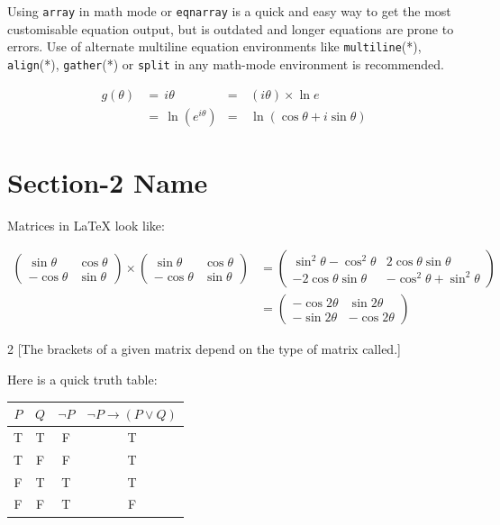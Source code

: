 
Using \verb+array+ in math mode or \verb+eqnarray+ is a quick and easy way to get the most customisable equation output, but is outdated and longer equations are prone to errors. Use of alternate multiline equation environments like \verb+multiline+(*), \verb+align+(*), \verb+gather+(*) or \verb+split+ in any math-mode environment is recommended.

\begin{align}\label{eq3}
g(\theta) &= \, i\theta &=& \, (i\theta) \times \ln e \nonumber \\
&= \, \ln(e^{i\theta}) &=& \, \ln(\cos\theta + i\sin\theta)
\end{align}


\section{Section-2 Name}

Matrices in {\LaTeX} look like:

\begin{align*}
\begin{pmatrix}
\sin\theta & \cos\theta\\
-\cos\theta & \sin\theta
\end{pmatrix}
\times
\begin{pmatrix}
\sin\theta & \cos\theta\\
-\cos\theta & \sin\theta
\end{pmatrix} &=
\begin{pmatrix}
\sin^2\theta - \cos^2\theta & 2\cos\theta\sin\theta\\
-2\cos\theta\sin\theta & -\cos^2\theta + \sin^2\theta
\end{pmatrix} \\
&=
\begin{pmatrix}
-\cos2\theta & \sin2\theta\\
-\sin2\theta & -\cos2\theta
\end{pmatrix}
\end{align*}
\begin{multicols}{2}
[The brackets of a given matrix depend on the type of matrix called.]
\begin{flushright}
    Here is a quick truth table:
\end{flushright}
\columnbreak
\begin{tabular}{|c c c | c|}
\hline %
$P$ & $Q$ & $\neg P$ & $\neg P \to (P \vee Q)$ \\ \hline
T & T & F & T \\
T & F & F & T \\
F & T & T & T \\
F & F & T & F \\ \hline
\end{tabular}
\end{multicols}

